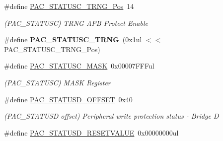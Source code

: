 \begin{DoxyCompactItemize}
\item 
\hypertarget{group___s_a_m_l21___p_a_c_ga4d1dd6d7a07420af21e10aeabd8bfd26}{}\#define \hyperlink{group___s_a_m_l21___p_a_c_ga4d1dd6d7a07420af21e10aeabd8bfd26}{P\+A\+C\+\_\+\+S\+T\+A\+T\+U\+S\+C\+\_\+\+T\+R\+N\+G\+\_\+\+Pos}~14\label{group___s_a_m_l21___p_a_c_ga4d1dd6d7a07420af21e10aeabd8bfd26}

\begin{DoxyCompactList}\small\item\em (P\+A\+C\+\_\+\+S\+T\+A\+T\+U\+S\+C) T\+R\+N\+G A\+P\+B Protect Enable \end{DoxyCompactList}\item 
\hypertarget{group___s_a_m_l21___p_a_c_ga6d202a9fc88c08f4513177d6359e0982}{}\#define {\bfseries P\+A\+C\+\_\+\+S\+T\+A\+T\+U\+S\+C\+\_\+\+T\+R\+N\+G}~(0x1ul $<$$<$ P\+A\+C\+\_\+\+S\+T\+A\+T\+U\+S\+C\+\_\+\+T\+R\+N\+G\+\_\+\+Pos)\label{group___s_a_m_l21___p_a_c_ga6d202a9fc88c08f4513177d6359e0982}

\item 
\hypertarget{group___s_a_m_l21___p_a_c_gacc821d1f16470c8436ec7f5f8015e1b6}{}\#define \hyperlink{group___s_a_m_l21___p_a_c_gacc821d1f16470c8436ec7f5f8015e1b6}{P\+A\+C\+\_\+\+S\+T\+A\+T\+U\+S\+C\+\_\+\+M\+A\+S\+K}~0x00007\+F\+F\+Ful\label{group___s_a_m_l21___p_a_c_gacc821d1f16470c8436ec7f5f8015e1b6}

\begin{DoxyCompactList}\small\item\em (P\+A\+C\+\_\+\+S\+T\+A\+T\+U\+S\+C) M\+A\+S\+K Register \end{DoxyCompactList}\item 
\hypertarget{group___s_a_m_l21___p_a_c_ga44e164fc209d12c6ac1481861d0545e5}{}\#define \hyperlink{group___s_a_m_l21___p_a_c_ga44e164fc209d12c6ac1481861d0545e5}{P\+A\+C\+\_\+\+S\+T\+A\+T\+U\+S\+D\+\_\+\+O\+F\+F\+S\+E\+T}~0x40\label{group___s_a_m_l21___p_a_c_ga44e164fc209d12c6ac1481861d0545e5}

\begin{DoxyCompactList}\small\item\em (P\+A\+C\+\_\+\+S\+T\+A\+T\+U\+S\+D offset) Peripheral write protection status -\/ Bridge D \end{DoxyCompactList}\item 
\hypertarget{group___s_a_m_l21___p_a_c_ga189046a9c50c9c323b117b3a80661ec9}{}\#define \hyperlink{group___s_a_m_l21___p_a_c_ga189046a9c50c9c323b117b3a80661ec9}{P\+A\+C\+\_\+\+S\+T\+A\+T\+U\+S\+D\+\_\+\+R\+E\+S\+E\+T\+V\+A\+L\+U\+E}~0x00000000ul\label{group___s_a_m_l21___p_a_c_ga189046a9c50c9c323b117b3a80661ec9}


\end{DoxyCompactItemize}
